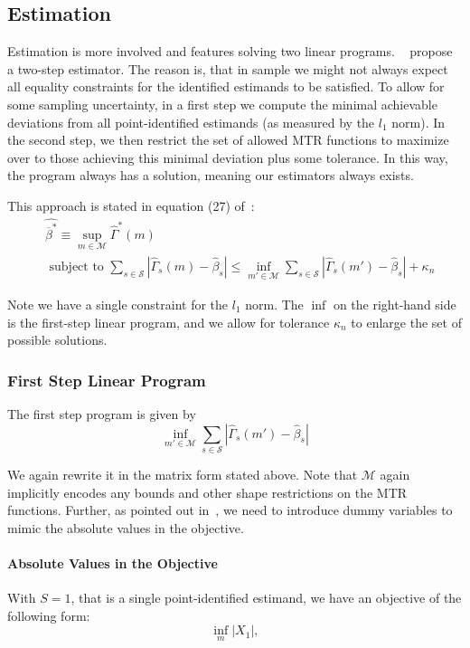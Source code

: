 \documentclass[12pt,a4paper,english]{article} %
\numberwithin{equation}{section}
\theoremstyle{definition}
\theoremstyle{remark}
\theoremstyle{plain}
\begin{document}
\subsection{Estimation}
Estimation is more involved and features solving two linear programs.
~\cite{mogstad2018using} propose a two-step estimator.
The reason is, that in sample we might not always expect all equality constraints for the identified estimands to be satisfied.
To allow for some sampling uncertainty, in a first step we compute the minimal achievable deviations from all point-identified estimands (as measured by the $l_1$ norm).
In the second step, we then restrict the set of allowed MTR functions to maximize over to those achieving this minimal deviation plus some tolerance.
In this way, the program always has a solution, meaning our estimators always exists.

This approach is stated in equation (27) of~\cite{mogstad2018using}:
\begin{align}
  & \hat{\overline{\beta}^*} \equiv \sup_{m\in \mathcal{M}}\hat{\Gamma}^*(m) \\
  & \text{ subject to } \sum_{s\in\mathcal{S}}|\hat{\Gamma}_s(m) - \hat{\beta}_s| \leq \inf_{m'\in \mathcal{M}} \sum_{s\in\mathcal{S}}|\hat{\Gamma}_s(m') - \hat{\beta}_s| + \kappa_n
\end{align}

Note we have a single constraint for the $l_1$ norm.
The $\inf$ on the right-hand side is the first-step linear program, and we allow for tolerance $\kappa_n$ to enlarge the set of possible solutions.

\subsubsection{First Step Linear Program}
The first step program is given by
\begin{equation*}
  \inf_{m'\in \mathcal{M}} \sum_{s\in\mathcal{S}}|\hat{\Gamma}_s(m') - \hat{\beta}_s|
\end{equation*}

We again rewrite it in the matrix form stated above.
Note that $\mathcal{M}$ again implicitly encodes any bounds and other shape restrictions on the MTR functions.
Further, as pointed out in~\cite{mogstad2018using}, we need to introduce dummy variables to mimic the absolute values in the objective.

\paragraph{Absolute Values in the Objective}
With $S = 1$, that is a single point-identified estimand, we have an objective of the following form:
\begin{equation*}
  \inf_m |X_1|,
\end{equation*}
\end{document}
